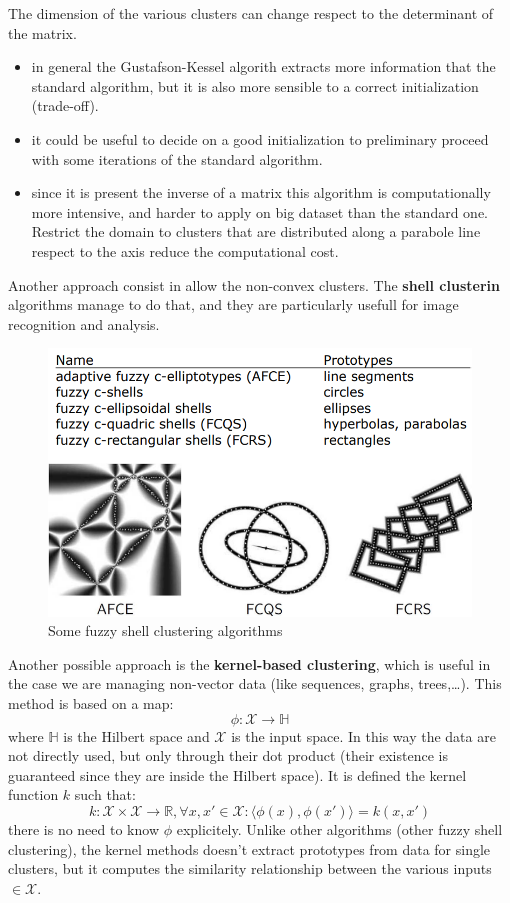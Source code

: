 \documentclass{article}
\begin{document}
The dimension of the various clusters can change respect to the determinant of the matrix.
\begin{itemize}
    \item in general the Gustafson-Kessel algorith extracts more information that the standard
          algorithm, but it is also more sensible to a correct initialization (trade-off).
    \item it could be useful to decide on a good initialization to preliminary
          proceed with some iterations of the standard algorithm.
    \item since it is present the inverse of a matrix this algorithm is computationally
          more intensive, and harder to apply on big dataset than the standard one. Restrict the domain
          to clusters that are distributed along a parabole line respect to the axis reduce the computational
          cost.
\end{itemize}
Another approach consist in allow the non-convex clusters. The \textbf{shell clusterin} algorithms
manage to do that, and they are particularly usefull for image recognition and analysis.
\begin{figure}[H]
    \centering
    \includegraphics[scale=0.5]{images/fuzzy_clust_alg.png}
    \caption{Some fuzzy shell clustering algorithms}
\end{figure}
Another possible approach is the \textbf{kernel-based clustering}, which is useful in the case we
are managing non-vector data (like sequences, graphs, trees,\dots). This method is based on a map:
$$\phi:\mathcal{X}\rightarrow\mathbb{H}$$
where $\mathbb{H}$ is the Hilbert space and $\mathcal{X}$ is the input space. In this way the data are not
directly used, but only through their dot product (their existence is guaranteed since they
are inside the Hilbert space). It is defined the kernel function $k$ such that:
$$k:\mathcal{X}\times\mathcal{X}\rightarrow\mathbb{R},\forall x,x'\in\mathcal{X}:\langle\phi(x),\phi(x')\rangle = k(x,x')$$
there is no need to know $\phi$ explicitely. Unlike other algorithms (other
fuzzy shell clustering), the kernel methods doesn't extract prototypes
from data for single clusters, but it computes the similarity relationship between the various inputs $\in\mathcal{X}$.
\end{document}
